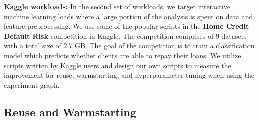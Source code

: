 \textbf{Kaggle workloads:} In the second set of workloads, we target interactive machine learning loads where a large portion of the analysis is spent on data and feature preprocessing.
We use some of the popular scripts in the \textbf{Home Credit Default Risk} competition in Kaggle.
The competition comprises of 9 datasets with a total size of 2.7 GB.
The goal of the competition is to train a classification model which predicts whether clients are able to repay their loans.
We utilize scripts written by Kaggle users and design our own scripts to measure the improvement for reuse, warmstarting, and hyperparameter tuning when using the experiment graph.


\subsection{Reuse and Warmstarting}
